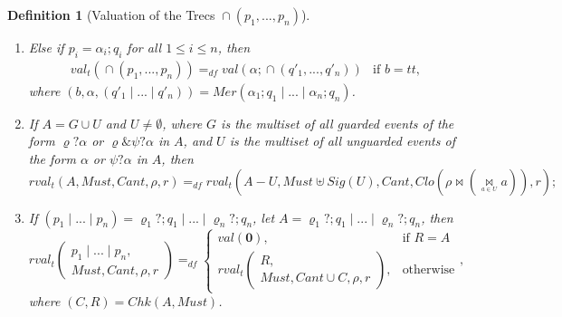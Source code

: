 \documentclass{fcs}
\newtheorem{mydef}{Definition}[section]
\newcommand{\halt}[0]{\mathbf{0}}
\newcommand{\true}[0]{\mathit{tt}}
\newcommand{\val}[0]{\mathit{val}}
\DeclareMathOperator{\seq}{;}
\DeclareMathOperator{\para}{\cap}
\newcommand{\Must}[0]{\mathit{Must}}
\newcommand{\Cannot}[0]{\mathit{Cant}}
\newcommand{\Chk}[0]{\mathit{Chk}}
\newcommand{\Closed}[0]{\mathit{Clo}}
\newcommand{\Signal}[0]{\mathit{Sig}}
\newcommand{\rfval}[0]{\mathit{rval}_t}
\newcommand{\valt}[0]{\val_t}
\newcommand{\join}[0]{\bowtie}
\DeclareMathOperator{\sep}{|}
\newcommand{\Merge}[0]{\mathit{Mer}}
\newcommand{\dddef}[0]{=_{df}}
\begin{document}
\begin{mydef}[Valuation of the Trecs $\para(p_1,...,p_n)$]
\begin{enumerate}
		\item
		Else if $p_i = \alpha_i;q_i$ for all $1\le i\le n$, then
		$$
        \begin{array}{ll}
        \valt(\para(p_1,...,p_n))
		\dddef
		\val(\alpha\seq \para(q'_1,...,q'_n)) &\mbox{if $b=\true$},
        \end{array}
		$$
		where $(b, \alpha, (q'_1\sep...\sep q'_n)) = \Merge(\alpha_1;q_1\sep...\sep \alpha_n;q_n)$.
		

		
		\ifx
		\item If $A = G \cup U$ and $U\neq \emptyset$, where $G$ is the multiset of all guarded events of the form $\varrho?\alpha$ or $\varrho\& \psi?\alpha$ in $A$, and $U$ is the multiset of all unguarded events of the form $\alpha$ or $\psi?\alpha$ in $A$, then
		$$\rfval(A, \Must, \Cannot, \rho, r)\dddef \rfval(A - U, \Must\uplus \Signal(U), \Cannot, \Closed(\rho\join (\underset{^{a\in U}}{\join}a)), r);$$
		\fi
		
		\ifx
		\item If $(p_1\sep...\sep p_n) = \varrho_1?;q_1\sep ...\sep \varrho_n?;q_n$, let $A = \varrho_1?;q_1\sep ...\sep \varrho_n?;q_n$, then
		$$\rfval\left(\begin{gathered}p_1\sep...\sep p_n, \\
		\Must, \Cannot, \rho, r\end{gathered}\right)
		\dddef \left\{\begin{array}{ll}
		\val(\halt), &\mbox{if $R = A$}\\
		\rfval	\left(\begin{gathered}R, \\
		\Must, \Cannot\cup C,\rho, r\end{gathered}\right),  &\mbox{otherwise}
		\end{array}
		\right.,$$
		where $(C, R) = \Chk(A, \Must)$.
		\fi
		

\end{enumerate}
\end{mydef}
\end{document}
